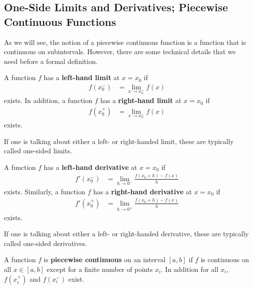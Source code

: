 \subsection{One-Side Limits and Derivatives; Piecewise Continuous Functions}

As we will see, the notion of a piecewise continuous function is a function that is continuous on subintervals.  However, there are some technical details that we need before a formal definition.  

\begin{definition} 
A function $f$ has a \textbf{left-hand limit} at $x=x_0$ if 
%
\begin{align*}
f(x_0^-) & = \lim_{x \rightarrow x_0^-} f(x) 
\end{align*}
exists.  In addition, a function $f$ has a \textbf{right-hand limit} at $x=x_0$ if 
%
\begin{align*}
f(x_0^+) & = \lim_{x \rightarrow x_0^-} f(x) 
\end{align*}
exists.  
\end{definition}

If one is talking about either a left- or right-handed limit, these are typically called one-sided limits.  
\begin{definition} 
A function $f$ has a \textbf{left-hand derivative} at $x=x_0$ if 
% 
\begin{align*}
f'(x_0^-) & = \lim_{h \rightarrow 0^-} \frac{f(x_0+h)-f(x)}{h} 
\end{align*} exists.   Similarly, a function $f$ has a \textbf{right-hand derivative} at $x=x_0$ if 
% 
\begin{align*}
f'(x_0^+) & = \lim_{h \rightarrow 0^+} \frac{f(x_0+h)-f(x)}{h} 
\end{align*} exists.  
\end{definition}

If one is talking about either a left- or right-handed derivative, these are typically called one-sided derivatives. 

\begin{definition}
A function $f$ is \textbf{piecewise continuous} on an interval $[a,b]$ if $f$ is continuous on all $x \in [a,b]$ except for a finite number of points $x_i$.   In addition for all $x_i$, $f(x_i^+)$ and $f(x_i^-)$ exist.  
\end{definition}


